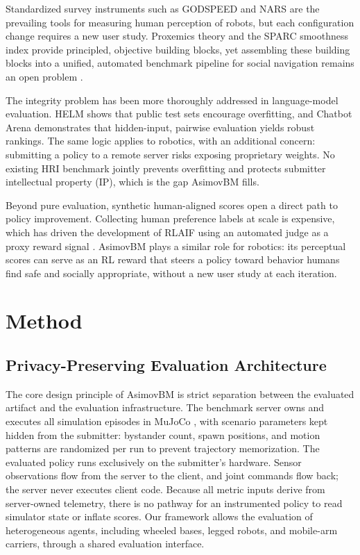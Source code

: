 \documentclass[conference]{IEEEtran}
\begin{document}
Standardized survey instruments such as GODSPEED \cite{bartneck2009godspeed} and NARS \cite{nomura2006nars}
are the prevailing tools for measuring human perception of robots, but each
configuration change requires a new user study.
Proxemics theory \cite{hall1966hidden} and the SPARC smoothness index \cite{balasubramanian2012sparc} provide
principled, objective building blocks, yet assembling these building blocks into a unified, automated benchmark pipeline for social navigation
remains an open problem \cite{mavrogiannis2023social,kruse2013human,tiezzi2025learningevaluateautonomousbehaviour}.

The integrity problem has been more thoroughly addressed in language-model
evaluation.
HELM \cite{liang2022helm} shows that public test sets encourage overfitting, and Chatbot Arena \cite{chatbot_arena}
demonstrates that hidden-input, pairwise evaluation yields robust rankings.
The same logic applies to robotics, with an additional concern: submitting
a policy to a remote server risks exposing proprietary weights.
No existing HRI benchmark jointly prevents overfitting and protects
submitter intellectual property (IP), which is the gap AsimovBM fills.

Beyond pure evaluation, synthetic human-aligned scores open a direct path
to policy improvement.
Collecting human preference labels at scale is expensive, which has driven the
development of RLAIF using an automated judge as a proxy reward signal \cite{christiano2017rlhf,lee2024rlaif,palan2019learningrewardfunctionsintegrating,narcomey2024learninghumanpreferencesrobot}.
AsimovBM plays a similar role for robotics: its perceptual scores can serve as
an RL reward that steers a policy toward behavior humans find
safe and socially appropriate, without a new user study at each iteration.


\section{Method}

\subsection{Privacy-Preserving Evaluation Architecture}

The core design principle of AsimovBM is strict separation between the
evaluated artifact and the evaluation infrastructure.
The benchmark server owns and executes all simulation episodes in MuJoCo \cite{todorov2012mujoco},
with scenario parameters kept hidden from the submitter: bystander count,
spawn positions, and motion patterns are randomized per run to prevent
trajectory memorization.
The evaluated policy runs exclusively on the submitter's hardware.
Sensor observations flow from the server to the client, and joint commands
flow back; the server never executes client code.
Because all metric inputs derive from server-owned telemetry, there is no
pathway for an instrumented policy to read simulator state or inflate scores.
Our framework allows the evaluation of heterogeneous
agents, including wheeled bases, legged robots, and mobile-arm carriers,
through a shared evaluation interface.
\end{document}
